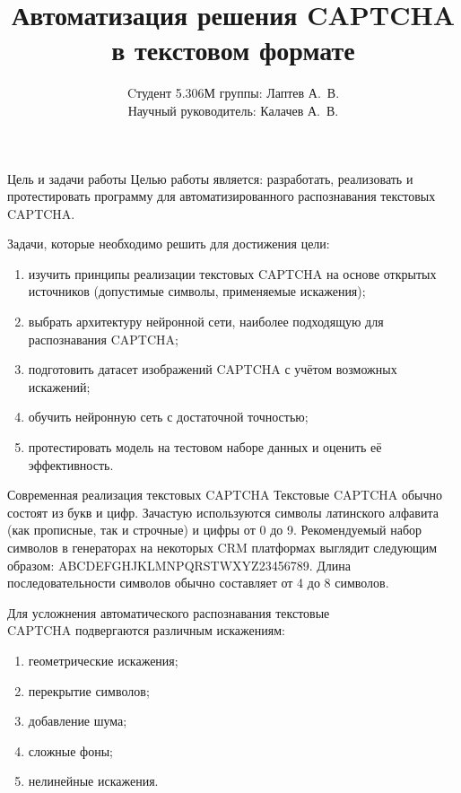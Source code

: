 \documentclass[12pt,a4paper,mathserif]{beamer}
\author[Лаптев А.В.]{{Cтудент 5.306М группы: Лаптев А.~В.}\\
{Научный руководитель: Калачев А.~В.}}
\title[Барнаул 2025]{Автоматизация решения CAPTCHA в текстовом формате}
\begin{document}
\begin{frame}
\maketitle
\end{frame}

\begin{frame}{Цель и задачи работы}
    \setlength{\parindent}{0.5cm}
    Целью работы является: разработать, реализовать и протестировать программу для автоматизированного распознавания текстовых CAPTCHA.

    Задачи, которые необходимо решить для достижения цели:

    \begin{enumerate}
        \item изучить принципы реализации текстовых CAPTCHA на основе открытых источников (допустимые символы, применяемые искажения);
        \item выбрать архитектуру нейронной сети, наиболее подходящую для распознавания CAPTCHA;
        \item подготовить датасет изображений CAPTCHA с учётом возможных искажений;
        \item обучить нейронную сеть с достаточной точностью;
        \item протестировать модель на тестовом наборе данных и оценить её эффективность.
    \end{enumerate}
\end{frame}

\begin{frame}{Современная реализация текстовых CAPTCHA}
    \setlength{\parindent}{0.5cm}
    Текстовые CAPTCHA обычно состоят из букв и цифр. Зачастую используются символы латинского алфавита (как прописные, так и строчные) и цифры от 0 до 9. Рекомендуемый набор символов в генераторах на некоторых CRM платформах выглядит следующим образом: ABCDEFGHJKLMNPQRSTWXYZ23456789. Длина последовательности символов обычно составляет от 4 до 8 символов.

    Для усложнения автоматического распознавания текстовые \\CAPTCHA подвергаются различным искажениям:
    \begin{enumerate}
        \item геометрические искажения;
        \item перекрытие символов;
        \item добавление шума;
        \item сложные фоны;
        \item нелинейные искажения.
    \end{enumerate}
\end{frame}
\end{document}
